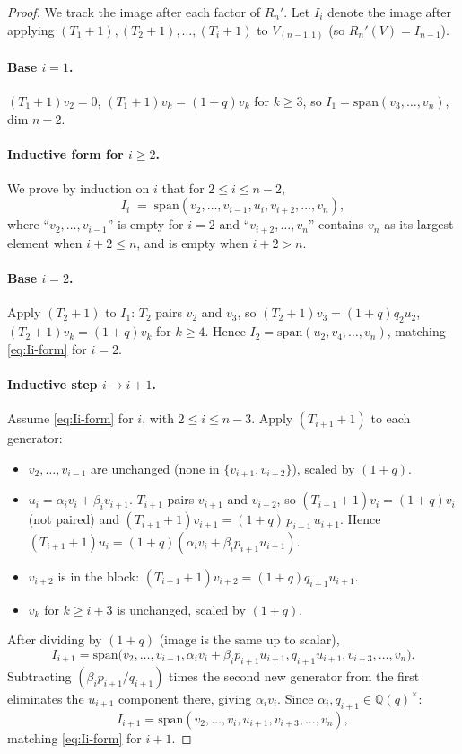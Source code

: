 \documentclass[11pt]{article}
\theoremstyle{definition}
\begin{document}
\begin{proof}
We track the image after each factor of $R_n'$. Let $I_i$ denote the
image after applying $(T_1{+}1),(T_2{+}1),\ldots,(T_i{+}1)$ to
$V_{(n-1,1)}$ (so $R_n'(V)=I_{n-1}$).

\paragraph{Base $i=1$.}
$(T_1{+}1)v_2=0$, $(T_1{+}1)v_k=(1+q)v_k$ for $k\ge 3$, so
$I_1=\mathrm{span}(v_3,\ldots,v_n)$, dim $n-2$.

\paragraph{Inductive form for $i\ge 2$.}
We prove by induction on $i$ that for $2\le i\le n-2$,
\begin{equation}\label{eq:Ii-form}
   I_i \;=\; \mathrm{span}(v_2,\ldots,v_{i-1},u_i,v_{i+2},\ldots,v_n),
\end{equation}
where ``$v_2,\ldots,v_{i-1}$'' is empty for $i=2$ and
``$v_{i+2},\ldots,v_n$'' contains $v_n$ as its largest element when
$i+2\le n$, and is empty when $i+2>n$.

\paragraph{Base $i=2$.} Apply $(T_2{+}1)$ to $I_1$: $T_2$ pairs $v_2$
and $v_3$, so $(T_2{+}1)v_3=(1+q)q_2 u_2$, $(T_2{+}1)v_k=(1+q)v_k$
for $k\ge 4$. Hence
$I_2=\mathrm{span}(u_2,v_4,\ldots,v_n)$, matching \eqref{eq:Ii-form}
for $i=2$.

\paragraph{Inductive step $i\to i+1$.} Assume \eqref{eq:Ii-form} for
$i$, with $2\le i\le n-3$. Apply $(T_{i+1}{+}1)$ to each generator:
\begin{itemize}[topsep=0.3em,itemsep=0.2em,leftmargin=2em]
\item $v_2,\ldots,v_{i-1}$ are unchanged (none in $\{v_{i+1},v_{i+2}\}$),
  scaled by $(1+q)$.
\item $u_i=\alpha_i v_i+\beta_i v_{i+1}$. $T_{i+1}$ pairs $v_{i+1}$
  and $v_{i+2}$, so $(T_{i+1}{+}1)v_i=(1+q)v_i$ (not paired) and
  $(T_{i+1}{+}1)v_{i+1}=(1+q)\,p_{i+1}\,u_{i+1}$. Hence
  $(T_{i+1}{+}1)u_i=(1+q)(\alpha_i v_i+\beta_i p_{i+1}u_{i+1})$.
\item $v_{i+2}$ is in the block: $(T_{i+1}{+}1)v_{i+2}=(1+q)q_{i+1}u_{i+1}$.
\item $v_k$ for $k\ge i+3$ is unchanged, scaled by $(1+q)$.
\end{itemize}
After dividing by $(1+q)$ (image is the same up to scalar),
\[
   I_{i+1}=\mathrm{span}\bigl(v_2,\ldots,v_{i-1},
   \alpha_i v_i+\beta_i p_{i+1}u_{i+1},
   q_{i+1}u_{i+1},
   v_{i+3},\ldots,v_n\bigr).
\]
Subtracting $(\beta_i p_{i+1}/q_{i+1})$ times the second new generator
from the first eliminates the $u_{i+1}$ component there, giving
$\alpha_i v_i$. Since $\alpha_i,q_{i+1}\in\mathbb{Q}(q)^\times$:
\[
   I_{i+1} = \mathrm{span}(v_2,\ldots,v_i,u_{i+1},v_{i+3},\ldots,v_n),
\]
matching \eqref{eq:Ii-form} for $i+1$.


\end{proof}
\end{document}
